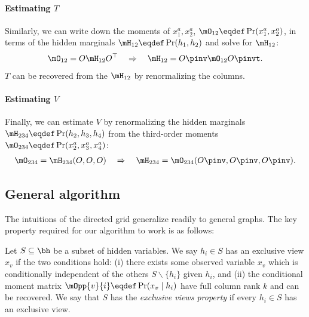\paragraph{Estimating $T$}
Similarly, we can write down the moments of $x^a_1, x^a_2$, $\mO_{12}
  \eqdef \Pr(x^a_1, x^a_2)$, in terms of the hidden marginals $\mH_{12}
  \eqdef \Pr(h_1, h_2)$ and solve for $\mH_{12}$:
\begin{align*}
\mO_{12} = O \mH_{12} O^\top \quad\Rightarrow\quad
  \mH_{12} = O\pinv  \mO_{12} O\pinvt .
\end{align*}
$T$ can be recovered from the $\mH_{12}$ by renormalizing the columns.

\paragraph{Estimating $V$}
Finally, we can estimate $V$ by renormalizing the hidden marginals
$\mH_{234} \eqdef \Pr(h_2, h_3, h_4)$ from the third-order moments
$\mO_{234} \eqdef \Pr(x^a_2, x^a_3, x^a_4)$:
\begin{align*}
  \mO_{234} = \mH_{234}(O, O, O) \quad\Rightarrow\quad
  \mH_{234} = \mO_{234}(O\pinv , O\pinv , O\pinv ).
\end{align*}

\subsection{General algorithm}
\label{sec:directedGeneral}


The intuitions of the directed grid generalize readily to general graphs.
The key property required for our algorithm to work is as follows:
\begin{definition}
  \label{def:exclusive-views}
Let $S \subseteq \bh$ be a subset of hidden variables.
We say $h_i \in S$ has an exclusive view $x_v$
  if the two conditions hold:
  (i) there exists some observed variable
  $x_{v}$ which is conditionally independent of the others $S \backslash \{ h_i \}$ given $h_i$,
  and (ii) the conditional moment matrix $\mOpp{v}{i} \eqdef
  \Pr(x_{v} \mid h_i)$ have full column rank $k$ and can be recovered.
We say that $S$ has the \emph{exclusive views property} if every $h_i \in S$ has an exclusive view.
\end{definition}

